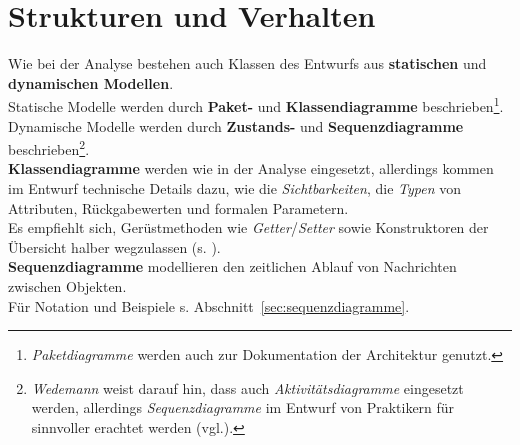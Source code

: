 \section{Strukturen und Verhalten}
Wie bei der Analyse bestehen auch Klassen des Entwurfs aus \textbf{statischen} und \textbf{dynamischen Modellen}.\\

\noindent
Statische Modelle werden durch \textbf{Paket-} und \textbf{Klassendiagramme} beschrieben\footnote{
\textit{Paketdiagramme} werden auch zur Dokumentation der Architektur genutzt.
}.\\

\noindent
Dynamische Modelle werden durch \textbf{Zustands-} und \textbf{Sequenzdiagramme} beschrieben\footnote{
\textit{Wedemann} weist darauf hin, dass auch \textit{Aktivitätsdiagramme} eingesetzt werden, allerdings \textit{Sequenzdiagramme} im Entwurf von Praktikern für sinnvoller erachtet werden (vgl.\cite[49]{Wed09b}).
}.\\

\noindent
\textbf{Klassendiagramme} werden wie in der Analyse eingesetzt, allerdings kommen im Entwurf technische Details dazu, wie die \textit{Sichtbarkeiten}, die \textit{Typen} von Attributen, Rückgabewerten und formalen Parametern.\\
Es empfiehlt sich, Gerüstmethoden wie \textit{Getter}/\textit{Setter} sowie Konstruktoren der Übersicht halber wegzulassen (s. \cite[50]{Wed09b}).\\

\noindent
\textbf{Sequenzdiagramme} modellieren den zeitlichen Ablauf von Nachrichten zwischen Objekten.\\
Für Notation und Beispiele s. Abschnitt~\ref{sec:sequenzdiagramme}.